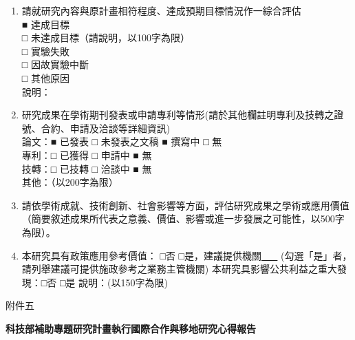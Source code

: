 \documentclass[12pt]{article}
\begin{document}
\begin{enumerate}
\item 請就研究內容與原計畫相符程度、達成預期目標情況作一綜合評估 \\
■ 達成目標 \\
□ 未達成目標（請說明，以100字為限） \\
\hspace*{2cm } □ 實驗失敗 \\
\hspace*{2cm } □ 因故實驗中斷 \\
\hspace*{2cm } □ 其他原因 \\
說明：

\vspace{1cm}

\item 研究成果在學術期刊發表或申請專利等情形(請於其他欄註明專利及技轉之證號、合約、申請及洽談等詳細資訊) \\
論文：■ 已發表 □ 未發表之文稿 ■ 撰寫中 □ 無 \\
專利：□ 已獲得 □ 申請中 ■ 無 \\
技轉：□ 已技轉 □ 洽談中 ■ 無 \\
其他：（以200字為限） \\

\vspace{1cm}

\item 請依學術成就、技術創新、社會影響等方面，評估研究成果之學術或應用價值（簡要敘述成果所代表之意義、價值、影響或進一步發展之可能性，以500字為限）。

\vspace{1cm}
\item 本研究具有政策應用參考價值：  □否    □是，建議提供機關\underline{\, \, \, \,}  \newline
    (勾選「是」者，請列舉建議可提供施政參考之業務主管機關) \newline
   本研究具影響公共利益之重大發現：□否    □是  \newline
   說明：(以150字為限)

\end{enumerate}


\newpage
\vspace*{-1cm}
\noindent 附件五
\begin{center}
{\bf \Large 科技部補助專題研究計畫執行國際合作與移地研究心得報告}
\end{center}
\end{document}
